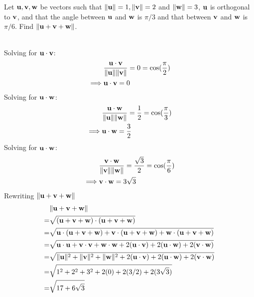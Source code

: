 \begin{problem}{\problemnum} 
Let $\mathbf{u}, \mathbf{v}, \mathbf{w}$ be vectors such that $\lVert\mathbf{u}\rVert=1, \lVert\mathbf{v}\rVert=2$ and $\lVert\mathbf{w}\rVert=3$, $\mathbf{u}$ is orthogonal to $\mathbf{v}$, and that the angle between $\mathbf{u}$ and $\mathbf{w}$ is $\pi/3$ and that between $\mathbf{v}$ and $\mathbf{w}$ is $\pi/6$. Find $\lVert\mathbf{u}+\mathbf{v}+\mathbf{w}\rVert$.
\end{problem}
\begin{solution}\\
    Solving for $\mathbf{u} \cdot \mathbf{v}$:
    \begin{align*}
        & \frac{\mathbf{u} \cdot \mathbf{v}}
               {\lVert\mathbf{u}\rVert\lVert\mathbf{v}\rVert} = 0 = \cos(\frac{\pi}{2})
        \\
        \implies& \mathbf{u} \cdot \mathbf{v} = 0
    \end{align*}
    Solving for $\mathbf{u} \cdot \mathbf{w}$:
    \begin{align*}
        & \frac{\mathbf{u} \cdot \mathbf{w}}
        {\lVert\mathbf{u}\rVert\lVert\mathbf{w}\rVert} = \frac{1}{2} = \cos(\frac{\pi}{3})
        \\
        \implies& \mathbf{u} \cdot \mathbf{w} = \frac{3}{2}
    \end{align*}
    Solving for $\mathbf{u} \cdot \mathbf{w}$:
    \begin{align*}
        & \frac{\mathbf{v} \cdot \mathbf{w}}
        {\lVert\mathbf{v}\rVert\lVert\mathbf{w}\rVert} = \frac{\sqrt{3}}{2} = \cos(\frac{\pi}{6})
        \\
        \implies& \mathbf{v} \cdot \mathbf{w} = 3\sqrt{3}
    \end{align*}
    Rewriting $\lVert\mathbf{u}+\mathbf{v}+\mathbf{w}\rVert$
    \begin{align*}
        & \lVert\mathbf{u}+\mathbf{v}+\mathbf{w}\rVert
        \\
        =& \sqrt{(\mathbf{u}+\mathbf{v}+\mathbf{w}) \cdot (\mathbf{u}+\mathbf{v}+\mathbf{w})}
        \\
        =& \sqrt{\mathbf{u} \cdot (\mathbf{u}+\mathbf{v}+\mathbf{w})
                      + \mathbf{v} \cdot (\mathbf{u}+\mathbf{v}+\mathbf{w})
                      + \mathbf{w} \cdot (\mathbf{u}+\mathbf{v}+\mathbf{w})}
        \\
        =& \sqrt{\mathbf{u} \cdot \mathbf{u}
                      + \mathbf{v} \cdot \mathbf{v}
                      + \mathbf{w} \cdot \mathbf{w}
                      + 2(\mathbf{u} \cdot \mathbf{v})
                      + 2(\mathbf{u} \cdot \mathbf{w})
                      + 2(\mathbf{v} \cdot \mathbf{w})}
        \\
        =& \sqrt{\lVert\mathbf{u}\rVert^{2}
                      + \lVert\mathbf{v}\rVert^{2}
                      + \lVert\mathbf{w}\rVert^{2}
                      + 2(\mathbf{u} \cdot \mathbf{v})
                      + 2(\mathbf{u} \cdot \mathbf{w})
                      + 2(\mathbf{v} \cdot \mathbf{w})}
        \\
        =& \sqrt{1^2 + 2^2 + 3^2 + 2(0) + 2(3/2) + 2(3\sqrt{3})}
        \\
        =& \sqrt{17+6\sqrt{3}}
    \end{align*}

\end{solution}
